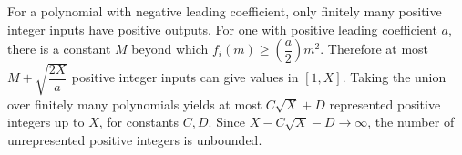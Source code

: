 For a polynomial with negative leading coefficient, only finitely many positive integer inputs have positive outputs. For one with positive leading coefficient $a$, there is a constant $M$ beyond which $f_i (m) \ge (\dfrac{a}{2}) m^2$. Therefore at most $M + \sqrt{\dfrac{2 X}{a}}$ positive integer inputs can give values in $[1,X]$. Taking the union over finitely many polynomials yields at most $C\sqrt X+D$ represented positive integers up to $X$, for constants $C,D$. Since $X-C\sqrt X-D\to\infty$, the number of unrepresented positive integers is unbounded.
